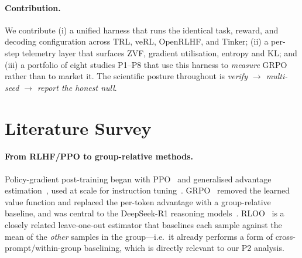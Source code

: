 \documentclass[12pt,a4paper]{report}
\begin{document}
\paragraph{Contribution.}
We contribute (i) a unified harness that runs the identical task, reward, and
decoding configuration across TRL, veRL, OpenRLHF, and Tinker; (ii) a per-step telemetry layer that
surfaces ZVF, gradient utilisation, entropy and KL; and (iii) a portfolio of
eight studies P1--P8 that use this harness to \emph{measure} GRPO rather than to
market it. The scientific posture throughout is \emph{verify $\rightarrow$
multi-seed $\rightarrow$ report the honest null}.

\section{Literature Survey}
\label{sec:lit}

\paragraph{From RLHF/PPO to group-relative methods.}
Policy-gradient post-training began with PPO~\cite{schulman2017ppo} and
generalised advantage estimation~\cite{schulman2015gae}, used at scale for
instruction tuning~\cite{ouyang2022instructgpt}. GRPO~\cite{shao2024deepseekmath}
removed the learned value function and replaced the per-token advantage with a
group-relative baseline, and was central to the DeepSeek-R1 reasoning
models~\cite{guo2025r1}. RLOO~\cite{ahmadian2024rloo} is a closely related
leave-one-out estimator that baselines each sample against the mean of the
\emph{other} samples in the group---i.e.\ it already performs a form of
cross-prompt/within-group baselining, which is directly relevant to our P2
analysis.
\end{document}
